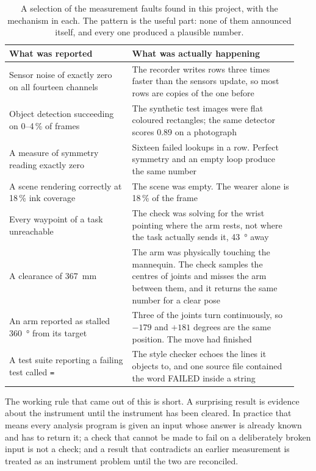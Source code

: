 \begin{table}[htbp]
  \centering
  \small
  \caption[Instrument faults]{A selection of the measurement faults found in
  this project, with the mechanism in each. The pattern is the useful part:
  none of them announced itself, and every one produced a plausible number.}
  \label{tab:instruments}
  \begin{tabular}{@{}p{0.40\linewidth}p{0.54\linewidth}@{}}
    \toprule
    \textbf{What was reported} & \textbf{What was actually happening} \\
    \midrule
    Sensor noise of exactly zero on all fourteen channels & The recorder
      writes rows three times faster than the sensors update, so most rows are
      copies of the one before \\
    Object detection succeeding on 0--4\,\% of frames & The synthetic test
      images were flat coloured rectangles; the same detector scores 0.89 on a
      photograph \\
    A measure of symmetry reading exactly zero & Sixteen failed lookups in a
      row. Perfect symmetry and an empty loop produce the same number \\
    A scene rendering correctly at 18\,\% ink coverage & The scene was empty.
      The wearer alone is 18\,\% of the frame \\
    Every waypoint of a task unreachable & The check was solving for the wrist
      pointing where the arm rests, not where the task actually sends it,
      \SI{43}{\degree} away \\
    A clearance of \SI{367}{\milli\metre} & The arm was physically touching the
      mannequin. The check samples the centres of joints and misses the arm
      between them, and it returns the same number for a clear pose \\
    An arm reported as stalled \SI{360}{\degree} from its target & Three of the
      joints turn continuously, so $-179$ and $+181$ degrees are the same
      position. The move had finished \\
    A test suite reporting a failing test called \texttt{=} & The style checker
      echoes the lines it objects to, and one source file contained the word
      FAILED inside a string \\
    \bottomrule
  \end{tabular}
\end{table}

The working rule that came out of this is short. A surprising result is
evidence about the instrument until the instrument has been cleared. In
practice that means every analysis program is given an input whose answer is
already known and has to return it; a check that cannot be made to fail on a
deliberately broken input is not a check; and a result that contradicts an
earlier measurement is treated as an instrument problem until the two are
reconciled.

